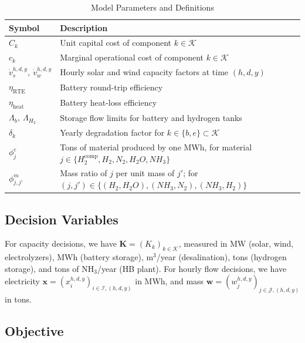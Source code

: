 \documentclass[11pt, letter]{article}
\begin{document}
\begin{table}[tbp]
\centering
\caption{Model Parameters and Definitions}
\begin{tabular}{ll}
\toprule
\textbf{Symbol} & \textbf{Description} \\
\midrule
$C_k$ & Unit capital cost of component $k \in \mathcal{K}$ \\
$c_k$ & Marginal operational cost of component $k \in \mathcal{K}$ \\
$\dot{v}_s^{h,d,y},\ \dot{v}_w^{h,d,y}$ & Hourly solar and wind capacity factors at time $(h,d,y)$ \\
$\eta_\text{RTE}$ & Battery round-trip efficiency \\
$\eta_\text{heat}$ & Battery heat-loss efficiency \\
$\Lambda_b,\ \Lambda_{H_2}$ & Storage flow limits for battery and hydrogen tanks \\
$\delta_k$ & Yearly degradation factor for $k \in \{b, e\} \subset \mathcal{K}$ \\
$\phi^e_j$ & Tons of material produced by one MWh, for material $j \in \{H_2^\text{comp}, H_2, N_2, H_2O, NH_3\}$ \\
$\phi^m_{j,j'}$ & Mass ratio of $j$ per unit mass of $j'$; for $(j,j') \in \{(H_2, H_2O), (NH_3, N_2), (NH_3, H_2)\}$ \\
\bottomrule
\end{tabular}
\label{tab:parameters}
\end{table}

\subsection{Decision Variables}
For capacity decisions, we have $\boldsymbol{K} =(K_k)_{k \in \mathcal{K}}$, measured in MW (solar, wind, electrolyzers), MWh (battery storage), m$^3$/year (desalination), tons (hydrogen storage), and tons of NH$_3$/year (HB plant). For hourly flow decisions, we have electricity $\boldsymbol{x} =(x_i^{h,d,y})_{i\in\mathcal{I}, (h,d,y)}$ in MWh, and mass $\boldsymbol{w} =(w_j^{h,d,y})_{j\in\mathcal{J}, (h,d,y)}$ in tons. 
\subsection{Objective}\label{section:objective}
\end{document}

